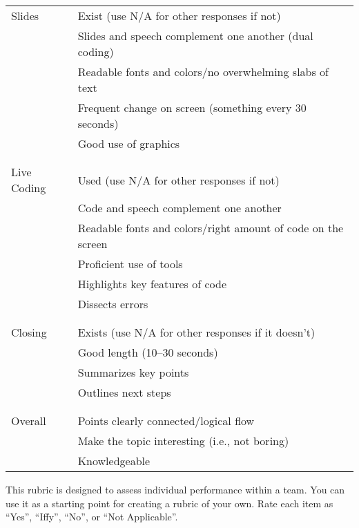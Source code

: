 \begin{longtable}{p{}p{}}
  Slides
  & Exist (use N/A for other responses if not) \\
  & Slides and speech complement one another (dual coding) \\
  & Readable fonts and colors/no overwhelming slabs of text \\
  & Frequent change on screen (something every 30 seconds) \\
  & Good use of graphics \\
  \\ [-1.5ex] \hline \\ [-1.5ex]

  Live Coding
  & Used (use N/A for other responses if not) \\
  & Code and speech complement one another \\
  & Readable fonts and colors/right amount of code on the screen \\
  & Proficient use of tools \\
  & Highlights key features of code \\
  & Dissects errors \\
  \\ [-1.5ex] \hline \\ [-1.5ex]

  Closing
  & Exists (use N/A for other responses if it doesn't) \\
  & Good length (10--30 seconds) \\
  & Summarizes key points \\
  & Outlines next steps \\
  \\ [-1.5ex] \hline \\ [-1.5ex]

  Overall
  & Points clearly connected/logical flow \\
  & Make the topic interesting (i.e., not boring) \\
  & Knowledgeable \\

\end{longtable}


This rubric is designed to assess individual performance within a
team. You can use it as a starting point for creating a rubric of
your own. Rate each item as ``Yes'', ``Iffy'', ``No'', or ``Not Applicable''.

